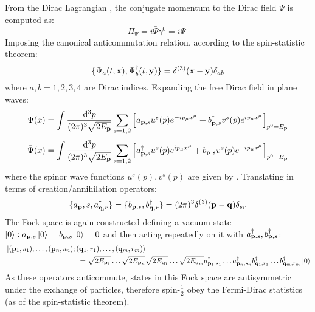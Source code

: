 From the Dirac Lagrangian , the conjugate momentum to the Dirac field $ \Psi $ is computed as:
\begin{equation}
  \Pi_\Psi = i \bar{\Psi} \gamma^0 = i \Psi^\dagger
  \label{eq:dirac-conj-mom}
\end{equation}
Imposing the canonical anticommutation relation, according to the spin-statistic theorem:
\begin{equation}
  \{\Psi_a(t,\mathbf{x}) , \Psi_b^\dagger(t,\mathbf{y})\} = \delta^{(3)}(\mathbf{x} - \mathbf{y}) \delta_{ab}
  \label{eq:dirac-anticomm}
\end{equation}
where $ a,b = 1,2,3,4 $ are Dirac indices. Expanding the free Dirac field in plane waves:
\begin{equation}
  \Psi(x) = \int \frac{\mathrm{d}^3p}{(2\pi)^3 \sqrt{2E_{\mathbf{p}}}} \sum_{s = 1,2} \left[ a_{\mathbf{p},s} u^s(p) e^{-i p_\mu x^\mu} + b_{\mathbf{p},s}^\dagger v^s(p) e^{i p_\mu x^\mu} \right]_{p^0 = E_{\mathbf{p}}}
  \label{eq:dirac-exp}
\end{equation}
\begin{equation}
  \bar{\Psi}(x) = \int \frac{\mathrm{d}^3p}{(2\pi)^3 \sqrt{2E_{\mathbf{p}}}} \sum_{s = 1,2} \left[ a_{\mathbf{p},s}^\dagger \bar{u}^s(p) e^{i p_\mu x^\mu} + b_{\mathbf{p},s} \bar{v}^s(p) e^{-i p_\mu x^\mu} \right]_{p^0 = E_{\mathbf{p}}}
  \label{eq:dirac-bar-exp}
\end{equation}
where the spinor wave functions $ u^s(p) , v^s(p) $ are given by . Translating  in terms of creation/annihilation operators:
\begin{equation}
  \{a_{\mathbf{p}},s , a_{\mathbf{q},r}^\dagger\} = \{b_{\mathbf{p},s} , b_{\mathbf{q},r}^\dagger\} = (2\pi)^3 \delta^{(3)}(\mathbf{p} - \mathbf{q}) \delta_{sr}
\end{equation}
The Fock space is again constructed defining a vacuum state $ \ket{0} : a_{\mathbf{p},s} \ket{0} = b_{\mathbf{p},s} \ket{0} = 0 $ and then acting repeatedly on it with $ a_{\mathbf{p}.s}^\dagger , b_{\mathbf{p},s}^\dagger $:
\begin{equation*}
  \begin{split}
    &\ket{(\mathbf{p}_1,s_1) , \dots , (\mathbf{p}_n,s_n) ; (\mathbf{q}_1,r_1) , \dots , (\mathbf{q}_m,r_m)} \\
    & \qquad \qquad \qquad \qquad \qquad = \sqrt{2E_{\mathbf{p}_1}} \dots \sqrt{2E_{\mathbf{p}_n}} \sqrt{2E_{\mathbf{q}_1}} \dots \sqrt{2E_{\mathbf{q}_m}} a_{\mathbf{p}_1,s_1}^\dagger \dots a_{\mathbf{p}_n,s_n}^\dagger b_{\mathbf{q}_1,r_1}^\dagger \dots b_{\mathbf{q}_m,r_m}^\dagger \ket{0}
  \end{split}
\end{equation*}
As these operators anticommute, states in this Fock space are antisymmetric under the exchange of particles, therefore spin-$ \frac{1}{2} $ obey the Fermi-Dirac statistics (as of the spin-statistic theorem).

